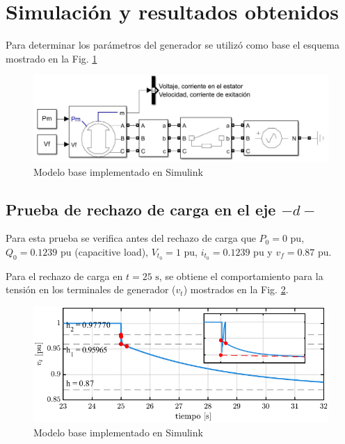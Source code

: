 \documentclass[conference]{IEEEtran}
\begin{document}
\section{Simulación y resultados obtenidos}
Para determinar los parámetros del generador se utilizó como base el esquema mostrado en la Fig. \ref{fig:Modelo_Simulink}

\begin{figure}[H]
    \centering
    \includegraphics[width=\linewidth]{Fig/Modelo_Simulink.pdf}
    \caption{Modelo base implementado en Simulink}
    \label{fig:Modelo_Simulink}
\end{figure}

\subsection{Prueba de rechazo de carga en el eje $-d-$}

Para esta prueba se verifica antes del rechazo de carga que $P_0=0\text{ pu}$, $Q_0=0.1239\text{ pu}$ (capacitive load),
$V_{t_0}=1\text{ pu}$, $i_{t_0}=0.1239\text{ pu}$ y $v_f=0.87\text{ pu}$.

Para el rechazo de carga en $t=25\text{ s}$, se obtiene el comportamiento para la tensión
en los terminales de generador ($v_t$) mostrados en la Fig. \ref{fig:fig1}.

\begin{figure}[ht]
    \centering
    \includegraphics[width=\linewidth]{Fig/fig1.pdf}
    \caption{Modelo base implementado en Simulink}
    \label{fig:fig1}
\end{figure}
\end{document}
